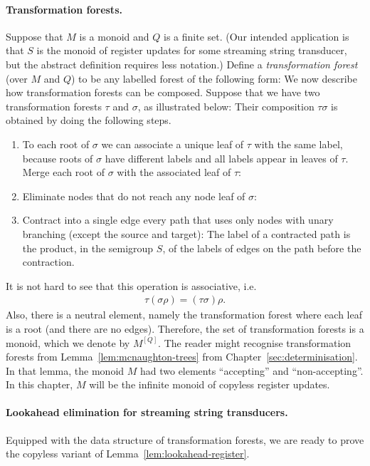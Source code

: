 \paragraph*{Transformation forests.}  
  Suppose that $M$ is a monoid and $Q$ is a finite set. (Our intended application is that $S$ is the monoid of register updates for some streaming string transducer, but the abstract definition requires less notation.)  Define a  \emph{transformation forest} (over $M$ and $Q$) to be any labelled forest of the following form:
We now describe how transformation forests can be composed. Suppose that we have two transformation forests $\tau$ and $\sigma$, as illustrated below:
Their composition $\tau\sigma$ is obtained by doing the following steps.
\begin{enumerate}
	\item To each root of $\sigma$ we can associate a unique leaf of $\tau$ with the same label, because roots of $\sigma$ have different labels and all labels appear in leaves of $\tau$. Merge each root of $\sigma$ with the associated  leaf of $\tau$:
\item 
Eliminate nodes that do not reach any node leaf of $\sigma$:
\item Contract into a single edge every path that uses only nodes with unary branching (except the source and target):
The label of a contracted path is the product, in the semigroup $S$, of the labels of edges on the path before the contraction.
\end{enumerate}
It is not hard to see that this operation is associative, i.e.~
\begin{align*}
\tau (\sigma \rho) = (\tau \sigma) \rho.
\end{align*} Also, there is a neutral element, namely the transformation forest where each leaf is a root (and there are no edges).  Therefore, the set of transformation forests is a monoid, which we denote by $M^{[Q]}$.
The reader might recognise transformation forests from Lemma~\ref{lem:mcnaughton-trees} from Chapter~\ref{sec:determinisation}. In that lemma, the monoid $M$ had two elements ``accepting'' and ``non-accepting''. In this chapter, $M$ will be the infinite monoid of copyless register updates. 


\paragraph*{Lookahead elimination for streaming string transducers.} Equipped with the data structure of transformation forests, we are ready to prove the copyless variant of Lemma~\ref{lem:lookahead-register}.

